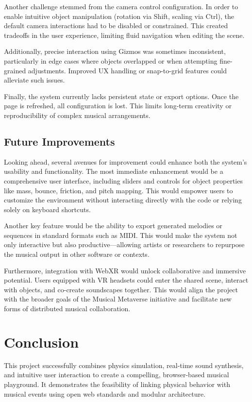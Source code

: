 \documentclass[a4paper,11pt]{article}
\begin{document}
Another challenge stemmed from the camera control configuration. In order to enable intuitive object manipulation (rotation via Shift, scaling via Ctrl), the default camera interactions had to be disabled or constrained. This created tradeoffs in the user experience, limiting fluid navigation when editing the scene.

Additionally, precise interaction using Gizmos was sometimes inconsistent, particularly in edge cases where objects overlapped or when attempting fine-grained adjustments. Improved UX handling or snap-to-grid features could alleviate such issues.

Finally, the system currently lacks persistent state or export options. Once the page is refreshed, all configuration is lost. This limits long-term creativity or reproducibility of complex musical arrangements.

\subsection{Future Improvements}
Looking ahead, several avenues for improvement could enhance both the system's usability and functionality. The most immediate enhancement would be a comprehensive user interface, including sliders and controls for object properties like mass, bounce, friction, and pitch mapping. This would empower users to customize the environment without interacting directly with the code or relying solely on keyboard shortcuts.

Another key feature would be the ability to export generated melodies or sequences in standard formats such as MIDI. This would make the system not only interactive but also productive—allowing artists or researchers to repurpose the musical output in other software or contexts.

Furthermore, integration with WebXR would unlock collaborative and immersive potential. Users equipped with VR headsets could enter the shared scene, interact with objects, and co-create soundscapes together. This would align the project with the broader goals of the Musical Metaverse initiative and facilitate new forms of distributed musical collaboration.
\newpage
\section{Conclusion}
This project successfully combines physics simulation, real-time sound synthesis, and intuitive user interaction to create a compelling, browser-based musical playground. It demonstrates the feasibility of linking physical behavior with musical events using open web standards and modular architecture. 
\end{document}

